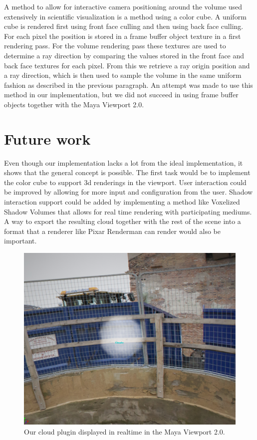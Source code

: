 \documentclass[11pt,twocolumn]{article}
\begin{document}
A method to allow for interactive camera positioning around the volume used extensively in scientific visualization is a method using a color cube.
A uniform cube is rendered first using front face culling and then using back face culling.
For each pixel the position is stored in a frame buffer object texture in a first rendering pass.
For the volume rendering pass these textures are used to determine a ray direction by comparing the values stored in the front face and back face textures for each pixel. From this we retrieve a ray origin position and a ray direction, which is then used to sample the volume in the same uniform fashion as described in the previous paragraph. An attempt was made to use this method in our implementation, but we did not succeed in using frame buffer objects together with the Maya Viewport 2.0.


\section{Future work}
Even though our implementation lacks a lot from the ideal implementation, it shows that the general concept is possible.
The first task would be to implement the color cube to support 3d renderings in the viewport.
User interaction could be improved by allowing for more input and configuration from the user.
Shadow interaction support could be added by implementing a method like Voxelized Shadow Volumes that allows for real time rendering with participating mediums.
A way to export the resulting cloud together with the rest of the scene into a format that a renderer like Pixar Renderman can render would also be important.

\begin{figure}
\includegraphics[width=\textwidth]{figures/cloudlol.png}
\caption{Our cloud plugin displayed in realtime in the Maya Viewport 2.0.}
\label{fig:mayaviewport_final}
\end{figure}

\endgroup
\newpage

\nocite{*}

\end{document}
